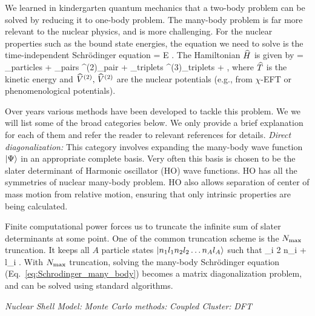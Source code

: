 
	We learned in kindergarten quantum mechanics that a two-body problem
	can be solved by reducing it to one-body problem.  The many-body
	problem is far more relevant to the nuclear physics, and is more
	challenging.
	For the nuclear properties such as the bound state energies, the
	equation we need to solve is the time-independent Schr\"{o}dinger equation
	\beq
	 \ket{\Psi} = E \ket{\Psi} \;.
	\label{eq:Schrodinger_many_body}
	\eeq
	The Hamiltonian $\widehat{H}$ is given by
	\beq
	 = \sum_{\rm particles}  + \sum_{\rm pairs}
	^{(2)}_{\rm pair} + \sum_{\rm triplets}
	^{(3)}_{\rm triplets} + \cdots \;,
	\eeq
	where $\widehat{T}$ is the kinetic energy and $\widehat{V}^{(2)}, \, \widehat{V}^{(2)}$ are
	the nuclear potentials (e.g., from $\chi$-EFT or phenomenological potentials).

	Over years various methods have been developed to tackle
  this problem.  We we will list some of the broad categories below.
	We only provide
  a brief explanation for each of them and refer the reader to relevant
  references for details.
	\bi
	\li
	\emph{Direct diagonalization:}
	This category involves expanding the many-body wave function ${|\Psi\rangle}$ in
	an appropriate complete basis.  Very often this basis is chosen to be the
	slater determinant of Harmonic oscillator (HO) wave functions.
	HO has all the symmetries of nuclear many-body problem.  HO also allows
	separation of center of mass motion from relative motion, ensuring that only
	intrinsic properties are being calculated.

	Finite computational power forces us to truncate the infinite sum of
	slater determinants at some point.  One of the common truncation scheme is
	the ${N_{\mathrm{max}}}$ truncation.  It keeps all $A$ particle states
	${|n_1 l_1 n_2 l_2 \ldots n_A l_A\rangle}$ such that
	\beq
	\sum_i 2 n_i + l_i \leq \Nmax \;.
	\eeq
	With ${N_{\mathrm{max}}}$ truncation, solving the many-body Schr\"{o}dinger equation
	(Eq.~\eqref{eq:Schrodinger_many_body}) becomes a matrix diagonalization
	problem, and can be solved using standard algorithms.

	\li
	\emph{Nuclear Shell Model:}
	\li
	\emph{Monte Carlo methods:}
	\li
	\emph{Coupled Cluster:}
	\li
	\emph{DFT}
	\ei


